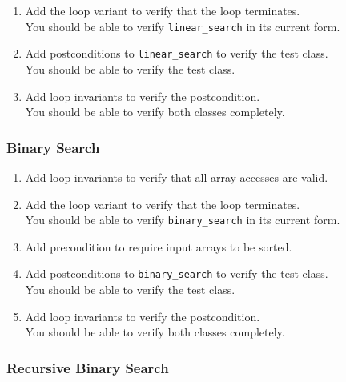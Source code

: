 \documentclass[a4paper,12pt]{article}
\newcommand{\e}[1]{\mbox{\lstinline[language=Eiffel]|#1|}}
\begin{document}
\begin{enumerate}[label=\bfseries Task \arabic*:, leftmargin=1.8cm]
\item Add the loop variant to verify that the loop terminates. \\
      You should be able to verify \e{linear_search} in its current form.
\item Add postconditions to \e{linear_search} to verify the test class. \\
      You should be able to verify the test class.
\item Add loop invariants to verify the postcondition. \\
      You should be able to verify both classes completely.
\end{enumerate}

\subsubsection*{Binary Search}

\begin{enumerate}[label=\bfseries Task \arabic*:, leftmargin=1.8cm]
\item Add loop invariants to verify that all array accesses are valid.
\item Add the loop variant to verify that the loop terminates. \\
      You should be able to verify \e{binary_search} in its current form.
\item Add precondition to require input arrays to be sorted.
\item Add postconditions to \e{binary_search} to verify the test class. \\
      You should be able to verify the test class.
\item Add loop invariants to verify the postcondition. \\
      You should be able to verify both classes completely.
\end{enumerate}

\subsubsection*{Recursive Binary Search}
\end{document}
